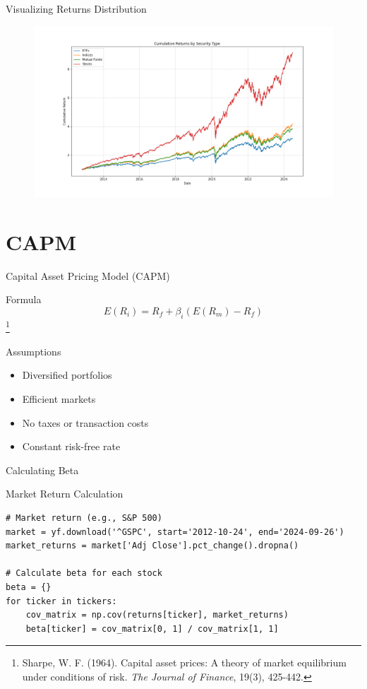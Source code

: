 \documentclass{beamer}
\begin{document}
\begin{frame}[fragile]{Visualizing Returns Distribution}
        \begin{figure}
            \centering
            \includegraphics[width=\textwidth]{cumulative_returns_by_type.png}
        \end{figure}
\end{frame}

\section{CAPM}
\begin{frame}{Capital Asset Pricing Model (CAPM)}
    \begin{block}{Formula} 
        \begin{equation*}
            E(R_i) = R_f + \beta_i (E(R_m) - R_f)
        \end{equation*}
        \footnote{Sharpe, W. F. (1964). Capital asset prices: A theory of market equilibrium under conditions of risk. \textit{The Journal of Finance}, 19(3), 425-442.}
    \end{block}
    \begin{block}{Assumptions}
        \begin{itemize}
            \item Diversified portfolios
            \item Efficient markets
            \item No taxes or transaction costs
            \item Constant risk-free rate
        \end{itemize}
    \end{block}
\end{frame}

\begin{frame}[fragile]{Calculating Beta}
    \begin{block}{Market Return Calculation}
        \begin{verbatim}
# Market return (e.g., S&P 500)
market = yf.download('^GSPC', start='2012-10-24', end='2024-09-26')
market_returns = market['Adj Close'].pct_change().dropna()

# Calculate beta for each stock
beta = {}
for ticker in tickers:
    cov_matrix = np.cov(returns[ticker], market_returns)
    beta[ticker] = cov_matrix[0, 1] / cov_matrix[1, 1]
        \end{verbatim}
    \end{block}
\end{frame}
\end{document}
